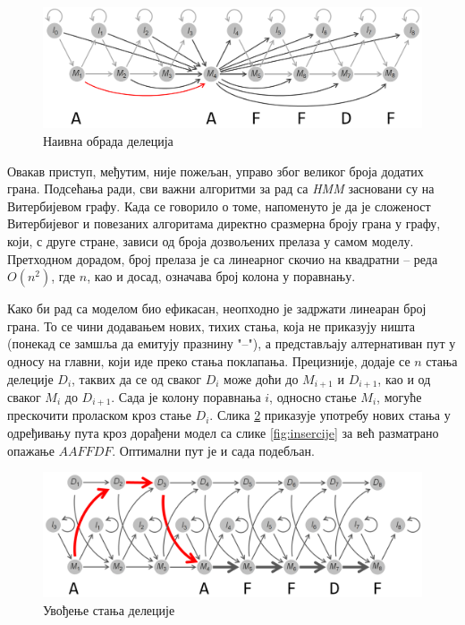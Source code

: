 \documentclass[12pt,oneside]{memoir}
\begin{document}
\begin{CJK}{UTF8}{ipxm}
\begin{figure}[H]
  \centering
  \includegraphics[width=\textwidth]{delecije1.png}
  \caption{Наивна обрада делеција \cite{compeau2015}}
  \label{fig:delecije1}
\end{figure}

Овакав приступ, међутим, није пожељан, управо због великог броја додатих грана. Подсећања ради, сви важни алгоритми за рад са \textit{HMM} засновани су на Витербијевом графу. Када се говорило о томе, напоменуто је да је сложеност Витербијевог и повезаних алгоритама директно сразмерна броју грана у графу, који, с друге стране, зависи од броја дозвољених прелаза у самом моделу. Претходном дорадом, број прелаза је са линеарног скочио на квадратни -- реда $O(n^2)$, где $n$, као и досад, означава број колона у поравнању.

Како би рад са моделом био ефикасан, неопходно је задржати линеаран број грана. То се чини додавањем нових, тихих стања, која не приказују ништа (понекад се замшља да емитују празнину "--"), а представљају алтернативан пут у односу на главни, који иде преко стања поклапања. Прецизније, додаје се $n$ стања делеције $D_i$, таквих да се од сваког $D_i$ може доћи до $M_{i+1}$ и $D_{i+1}$, као и од сваког $M_i$ до $D_{i+1}$. Сада је колону поравнања $i$, односно стање $M_i$, могуће прескочити проласком кроз стање $D_i$. Слика \ref{fig:delecije2} приказује употребу нових стања у одређивању пута кроз дорађени модел са слике \ref{fig:insercije} за већ разматрано опажање $AAFFDF$. Оптимални пут је и сада подебљан.

\begin{figure}[H]
  \centering
  \includegraphics[width=\textwidth]{delecije2.png}
  \caption{Увођење стања делеције \cite{compeau2015}}
  \label{fig:delecije2}
\end{figure}


\end{CJK}
\end{document}
